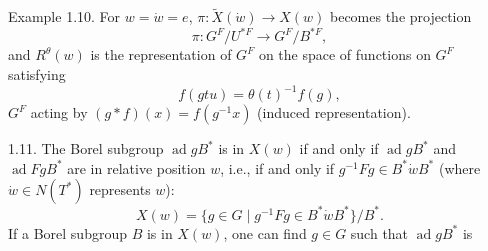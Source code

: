 \documentclass[9pt,twoside]{extarticle}
\begin{document}
{Example 1.10. For \(w=\dot w=e\), \(\pi:\widetilde X(\dot w)\to X(w)\) becomes the projection \[
\pi:G^F/U^{*F}\longrightarrow G^F/B^{*F},
\] and \(R^\theta(w)\) is the representation of \(G^F\) on the space of functions on \(G^F\) satisfying \[
f(gtu)=\theta(t)^{-1}f(g),
\]  \(G^F\) acting by \((g*f)(x)=f(g^{-1}x)\) (induced representation).\par

1.11. The Borel subgroup \(\operatorname{ad}gB^*\) is in \(X(w)\) if and only if \(\operatorname{ad}gB^*\) and \(\operatorname{ad}FgB^*\) are in relative position \(w\), i.e., if and only if \(g^{-1}Fg\in B^*\dot wB^*\) (where \(\dot w\in N(T^*)\) represents \(w\)): \[
\tag{1.11.1}
X(w)=\{g\in G\mid g^{-1}Fg\in B^*\dot wB^*\}/B^*.
\] If a Borel subgroup \(B\) is in \(X(w)\), one can find \(g\in G\) such that \(\operatorname{ad}gB^*\) is\par
}
\end{document}
